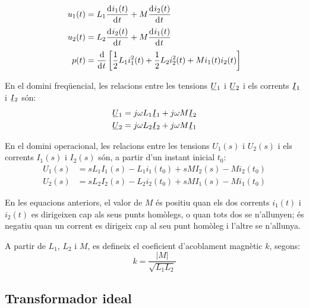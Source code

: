 \hfill
\begin{minipage}[b]{6.5cm}
	
	\label{pic:acobl}
\end{minipage}
\hfill
\begin{minipage}[b][3.8cm][t]{10cm}
	\begin{align}
		u_1(t) &= L_1 \deriv{i_1(t)}{t} + M \deriv{i_2(t)}{t} \\
		u_2(t) &= L_2 \deriv{i_2(t)}{t} + M \deriv{i_1(t)}{t} \\
		p(t) &= \frac{\diff}{\diff t} \left[ \frac{1}{2} L_1 i_1^2(t) + \frac{1}{2} L_2 i_2^2(t) +
		M i_1(t) i_2(t) \right]
	\end{align}
\end{minipage}


En el domini freqüencial, les relacions entre les tensions $\cmplx{U}_1$ i $\cmplx{U}_2$ i els corrents $\cmplx{I}_1$ i $\cmplx{I}_2$ són:
\begin{align}
	\cmplx{U}_1 &= j \omega L_1 \cmplx{I}_1 + j \omega M \cmplx{I}_2 \\
	\cmplx{U}_2 &= j \omega L_2 \cmplx{I}_2 + j \omega M \cmplx{I}_1
\end{align}

En el domini operacional, les relacions entre les tensions $U_1(s)$  i $U_2(s)$ i els corrents $I_1(s)$ i $I_2(s)$ són, a partir d'un instant inicial $t_0$:
\begin{align}
	U_1(s) &= s L_1 I_1(s) - L_1 i_1(t_0) + s M I_2(s) - M i_2(t_0) \\
	U_2(s) &= s L_2 I_2(s) - L_2 i_2(t_0) + s M I_1(s) - M i_1(t_0)
\end{align}

En les equacions anteriors, el valor de $M$ és positiu quan els dos corrents $i_1(t)$ i $i_2(t)$ es dirigeixen cap als seus punts homòlegs, o quan tots dos  se n'allunyen; és negatiu quan un corrent es dirigeix cap al seu punt homòleg i l'altre se n'allunya.

A partir de $L_1$, $L_2$ i $M$, es defineix el coeficient d'acoblament magnètic $k$, segons:
\begin{equation}
	k = \frac{|M|}{\sqrt{L_1 L_2}}
\end{equation}

\subsection{Transformador ideal} 

